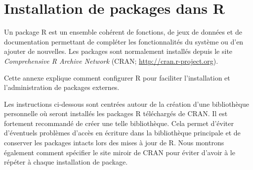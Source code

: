 \chapter{Installation de packages dans R}
\label{packages}

Un package R est un ensemble cohérent de fonctions, de jeux de données
et de documentation permettant de compléter les fonctionnalités du
système ou d'en ajouter de nouvelles. Les packages sont normalement
installés depuis le site \emph{Comprehensive R Archive
  Network} (CRAN; \url{http://cran.r-project.org}).

Cette annexe explique comment configurer R pour faciliter
l'installation et l'administration de packages externes.

Les instructions ci-dessous sont centrées autour de la création d'une
bibliothèque personnelle où seront installés les packages R
téléchargés de CRAN. Il est fortement recommandé de créer une telle
bibliothèque. Cela permet d'éviter d'éventuels problèmes d'accès en
écriture dans la bibliothèque principale et de conserver les packages
intacts lors des mises à jour de R. Nous montrons également comment
spécifier le site miroir de CRAN pour éviter d'avoir à le répéter à
chaque installation de package.
